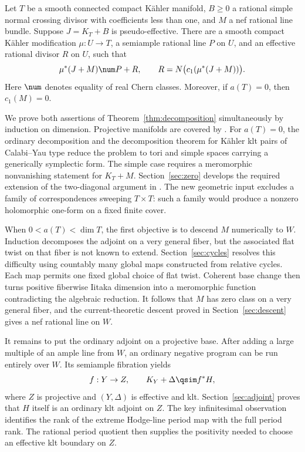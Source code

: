 \begin{theorem}\label{thm:decomposition}
Let \(T\) be a smooth connected compact K\"ahler manifold, \(B\geq0\)
a rational simple normal crossing divisor with coefficients less than
one, and \(M\) a nef rational line bundle. Suppose
\(J=K_T+B\) is pseudo-effective. There are a smooth compact K\"ahler
modification \(\mu:U\to T\), a semiample rational line \(P\) on \(U\),
and an effective rational divisor \(R\) on \(U\), such that
\[
 \mu^*(J+M)\num P+R,\qquad
 R=N\bigl(c_1(\mu^*(J+M))\bigr).
\]
Here \(\num\) denotes equality of real Chern classes.
Moreover, if \(a(T)=0\), then \(c_1(M)=0\).
\end{theorem}

We prove both assertions of Theorem~\ref{thm:decomposition}
simultaneously by induction on dimension. Projective manifolds are
covered by \cite{P}. For \(a(T)=0\), the ordinary decomposition and
the decomposition theorem for K\"ahler klt pairs of Calabi--Yau type
\cite[Corollary~1.4]{BBYv2} reduce the problem to tori and simple
spaces carrying a generically symplectic form. The simple case requires
a meromorphic nonvanishing statement for \(K_T+M\).
Section~\ref{sec:zero} develops the required extension of the
two-diagonal argument in \cite[Section~6]{K}. The new geometric input
excludes a family of correspondences sweeping \(T\times T\): such a
family would produce a nonzero holomorphic one-form on a fixed finite
cover.

When \(0<a(T)<\dim T\), the first objective is to descend \(M\)
numerically to \(W\). Induction decomposes the adjoint on a very general
fiber, but the associated flat twist on that fiber is not known to
extend. Section~\ref{sec:cycles} resolves this difficulty using
countably many global maps constructed from relative cycles.
Each map permits one fixed global choice of flat twist. Coherent
base change then turns positive fiberwise Iitaka dimension into a
meromorphic function contradicting the algebraic reduction.
It follows that \(M\) has zero class on a very general fiber, and
the current-theoretic descent proved in Section~\ref{sec:descent}
gives a nef rational line on \(W\).

It remains to put the ordinary adjoint on a projective base.
After adding a large multiple of an ample line from \(W\), an ordinary
negative program can be run entirely over \(W\).
Its semiample fibration yields
\[
 f:Y\to Z,\qquad K_Y+\Delta\qsim f^*H,
\]
where \(Z\) is projective and \((Y,\Delta)\) is effective and klt.
Section~\ref{sec:adjoint} proves that \(H\) itself is an ordinary
klt adjoint on \(Z\). The key infinitesimal observation identifies
the rank of the extreme Hodge-line period map with the full period
rank. The rational period quotient then supplies the positivity
needed to choose an effective klt boundary on \(Z\).

